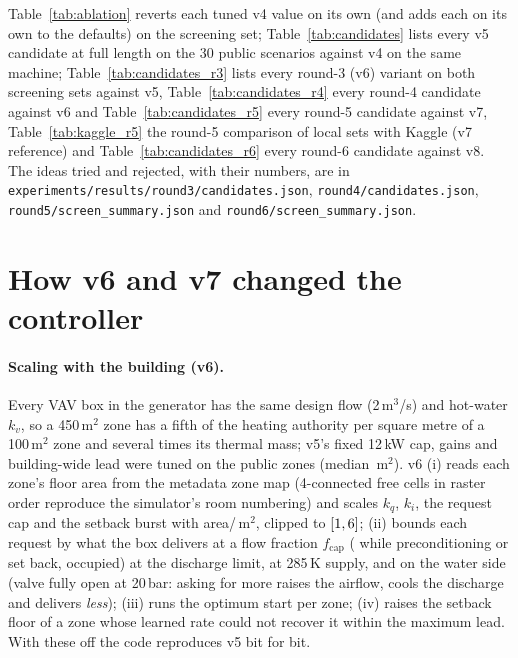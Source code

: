 \documentclass{article}
\begin{document}
Table~\ref{tab:ablation} reverts each tuned v4 value on its own (and adds each on its own to
the defaults) on the screening set; Table~\ref{tab:candidates} lists every v5 candidate at
full length on the 30 public scenarios against v4 on the same machine;
Table~\ref{tab:candidates_r3} lists every round-3 (v6) variant on both screening sets against
v5, Table~\ref{tab:candidates_r4} every round-4 candidate against v6 and Table~\ref{tab:candidates_r5}
every round-5 candidate against v7, Table~\ref{tab:kaggle_r5} the round-5 comparison of local sets with Kaggle
(v7 reference) and Table~\ref{tab:candidates_r6} every round-6 candidate against v8. The ideas tried and rejected,
with their numbers, are in \texttt{experiments/results/round3/candidates.json}, \texttt{round4/candidates.json},
\texttt{round5/screen\_summary.json} and \texttt{round6/screen\_summary.json}.






\section{How v6 and v7 changed the controller}
\label{app:versions}

\paragraph{Scaling with the building (v6).}
Every VAV box in the generator has the same design flow (2\,m$^3$/s) and hot-water $k_v$, so
a 450\,m$^2$ zone has a fifth of the heating authority per square metre of a 100\,m$^2$ zone
and several times its thermal mass; v5's fixed 12\,kW cap, gains and building-wide lead were
tuned on the public zones (median \PubZoneAreaMedian\,m$^2$). v6 (i) reads each zone's floor
area from the metadata zone map (4-connected free cells in raster order reproduce the
simulator's room numbering) and scales $k_q$, $k_i$, the request cap and the setback burst with
area/\ParAreaRef\,m$^2$, clipped to $[1, 6]$; (ii) bounds each
request by what the box delivers at a flow fraction $f_{\text{cap}}$ (\VSixFCapPre{} while
preconditioning or set back, \ParFCapOcc{} occupied) at the discharge limit, at 285\,K supply,
and on the water side (valve fully open at 20\,bar: asking for more raises the airflow, cools
the discharge and delivers \emph{less}); (iii) runs the optimum start per zone; (iv) raises the
setback floor of a zone whose learned rate could not recover it within the maximum lead. With
these off the code reproduces v5 bit for bit.
\end{document}
